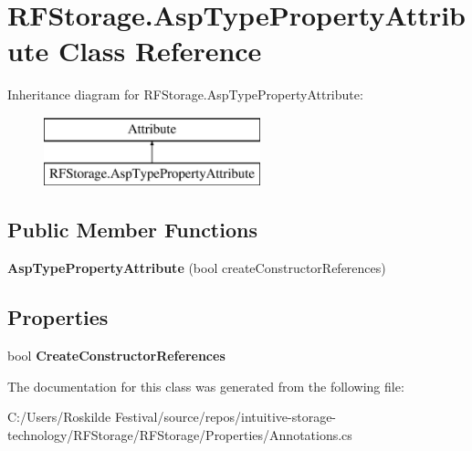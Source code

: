 \hypertarget{class_r_f_storage_1_1_asp_type_property_attribute}{}\section{R\+F\+Storage.\+Asp\+Type\+Property\+Attribute Class Reference}
\label{class_r_f_storage_1_1_asp_type_property_attribute}
Inheritance diagram for R\+F\+Storage.\+Asp\+Type\+Property\+Attribute\+:\begin{figure}[H]
\begin{center}
\leavevmode
\includegraphics[height=2.000000cm]{class_r_f_storage_1_1_asp_type_property_attribute}
\end{center}
\end{figure}
\subsection*{Public Member Functions}
\begin{DoxyCompactItemize}
\item 
\mbox{\label{class_r_f_storage_1_1_asp_type_property_attribute_a4af39daccd9d1c440738f26371751326}} 
{\bfseries Asp\+Type\+Property\+Attribute} (bool create\+Constructor\+References)
\end{DoxyCompactItemize}
\subsection*{Properties}
\begin{DoxyCompactItemize}
\item 
\mbox{\label{class_r_f_storage_1_1_asp_type_property_attribute_a11524c19cfb1861dee33c39b6fa82dac}} 
bool {\bfseries Create\+Constructor\+References}
\end{DoxyCompactItemize}


The documentation for this class was generated from the following file\+:\begin{DoxyCompactItemize}
\item 
C\+:/\+Users/\+Roskilde Festival/source/repos/intuitive-\/storage-\/technology/\+R\+F\+Storage/\+R\+F\+Storage/\+Properties/Annotations.\+cs\end{DoxyCompactItemize}
